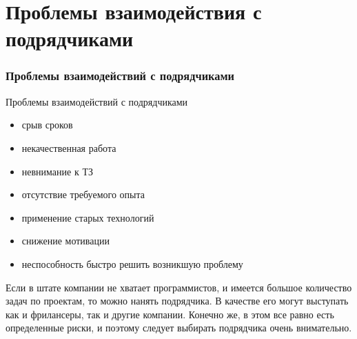 \documentclass{industrial-development}
\begin{document}
\section{Проблемы взаимодействия с подрядчиками}
\begin{frame} \frametitle{Проблемы взаимодействий с подрядчиками}
  \begin{block}{Проблемы взаимодействий с подрядчиками}
  \end{block}

\begin{itemize}
 \item срыв сроков 
 \item некачественная работа
 \item невнимание к ТЗ
 \item отсутствие требуемого опыта
 \item применение старых технологий
 \item снижение мотивации
 \item неспособность быстро решить возникшую проблему
  \end{itemize}
\end{frame}

\lecturenotes
Если в штате компании не хватает программистов, и имеется большое количество задач по проектам, то можно нанять подрядчика. В качестве его могут выступать как и фрилансеры, так и другие компании. Конечно же, в этом все равно есть определенные риски, и поэтому следует выбирать подрядчика очень внимательно. 

\begin{thebibliography}{99}
\end{thebibliography}
\end{document}
